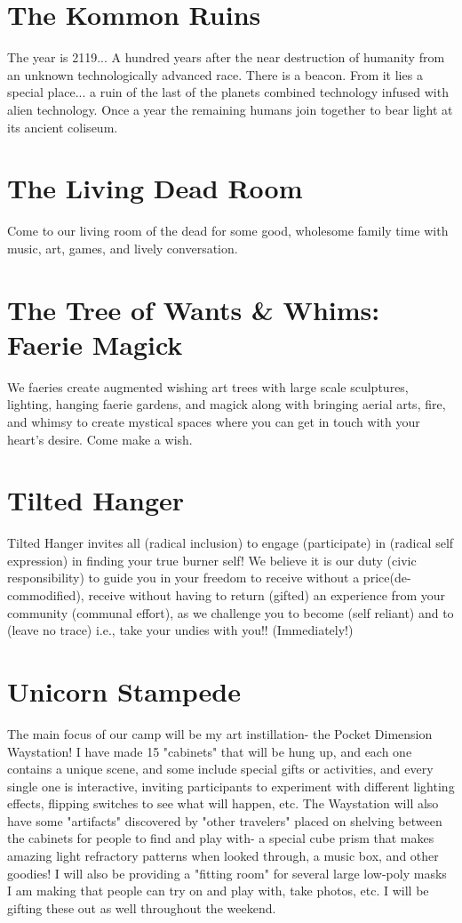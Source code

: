 \section*{The Kommon Ruins}
The year is 2119... A hundred years after the near destruction of humanity from an unknown technologically advanced race. There is a beacon. From it lies a special place... a ruin of the last of the planets combined technology infused with alien technology. Once a year the remaining humans join together to bear light at its ancient coliseum. 


\section*{The Living Dead Room}
Come to our living room of the dead for some good, wholesome family time with music, art, games, and lively conversation. 


\section*{The Tree of Wants \& Whims: Faerie Magick}
We faeries create augmented wishing art trees with large scale sculptures, lighting, hanging faerie gardens, and magick along with bringing aerial arts, fire, and whimsy to create mystical spaces where you can get in touch with your heart's desire. Come make a wish.


\section*{Tilted Hanger}
Tilted Hanger invites all (radical inclusion) to engage (participate) in (radical self expression) in finding your true burner self! We believe it is our duty (civic responsibility) to guide you in your freedom to receive without a price(de-commodified), receive without having to return (gifted) an experience from your community (communal effort), as we challenge you to become (self reliant) and to (leave no trace) i.e., take your undies with you!! (Immediately!) 


\section*{Unicorn Stampede}
The main focus of our camp will be my art instillation- the Pocket Dimension Waystation! I have made 15 "cabinets" that will be hung up, and each one contains a unique scene, and some include special gifts or activities, and every single one is interactive, inviting participants to experiment with different lighting effects, flipping switches to see what will happen, etc. The Waystation will also have some "artifacts" discovered by "other travelers" placed on shelving between the cabinets for people to find and play with- a special cube prism that makes amazing light refractory patterns when looked through, a music box, and other goodies! I will also be providing a "fitting room" for several large low-poly masks I am making that people can try on and play with, take photos, etc. I will be gifting these out as well throughout the weekend. 


